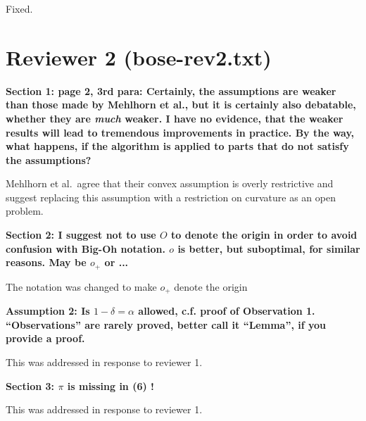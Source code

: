 \documentclass[lotsofwhite]{patmorin}
\newenvironment{comment}{\noindent\bf}{}
\newenvironment{response}{\noindent}{}
\begin{document}
\begin{response}
Fixed.
\end{response}


\section*{Reviewer 2 (bose-rev2.txt)}

\begin{comment}
Section 1: page 2, 3rd para: Certainly, the assumptions are weaker than 
those made by Mehlhorn et al., but it is certainly also debatable, whether 
they are {\em much} weaker. I have no evidence, that the weaker results will 
lead to tremendous improvements in practice. By the way, what happens, if 
the algorithm is applied to parts that do not satisfy the assumptions?
\end{comment}

\begin{response}
Mehlhorn et al.\ agree that their convex assumption is overly
restrictive and suggest replacing this assumption with a restriction
on curvature as an open problem.
\end{response}

\begin{comment}
Section 2: I suggest not to use $O$ to denote the origin in order to
avoid confusion with Big-Oh notation. $o$ is better, but suboptimal,
for similar reasons. May be $o_+$ or ...
\end{comment}

\begin{response}
The notation was changed to make $o_+$ denote the origin
\end{response}

\begin{comment}
Assumption 2: Is $1 - \delta = \alpha$ allowed, c.f. proof of
Observation 1.  ``Observations'' are rarely proved, better call it
``Lemma'', if you provide a proof.
\end{comment}

\begin{response}
This was addressed in response to reviewer 1.
\end{response}

\begin{comment}
Section 3: $\pi$ is missing in (6) !
\end{comment}

\begin{response}
This was  addressed in response to reviewer 1.
\end{response}
\end{document}
